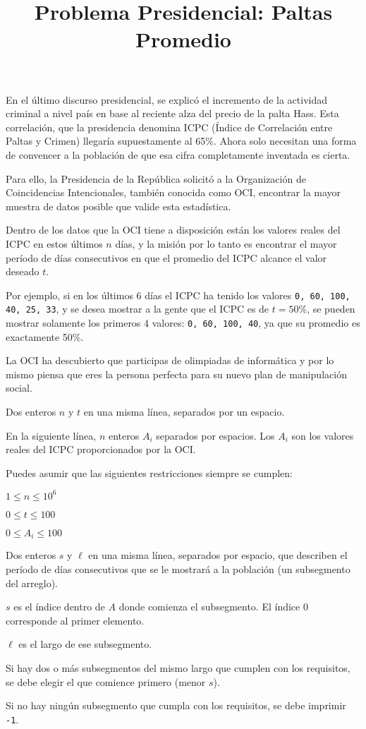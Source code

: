 \documentclass{oci}
\title{Problema Presidencial: Paltas Promedio}
\begin{document}
\begin{problemDescription}
En el último discurso presidencial, se explicó el incremento de la actividad criminal a nivel país en base al reciente alza del precio de la palta Hass. Esta correlación, que la presidencia denomina ICPC (Índice de Correlación entre Paltas y Crimen) llegaría supuestamente al 65\%. Ahora solo necesitan una forma de convencer a la población de que esa cifra completamente inventada es cierta.

Para ello, la Presidencia de la República solicitó a la Organización de Coincidencias Intencionales, también conocida como OCI, encontrar la mayor muestra de datos posible que valide esta estadística.

Dentro de los datos que la OCI tiene a disposición están los valores reales del ICPC en estos últimos $n$ días, y la misión por lo tanto es encontrar el mayor período de días consecutivos en que el promedio del ICPC alcance el valor deseado $t$.

Por ejemplo, si en los últimos 6 días el ICPC ha tenido los valores \texttt{0, 60, 100, 40, 25, 33}, y se desea mostrar a la gente que el ICPC es de $t=50\%$, se pueden mostrar solamente los primeros 4 valores: \texttt{0, 60, 100, 40}, ya que su promedio es exactamente 50\%.

La OCI ha descubierto que participas de olimpiadas de informática y por lo mismo piensa que eres la persona perfecta para su nuevo plan de manipulación social.
\end{problemDescription}

\begin{inputDescription}
Dos enteros $n$ y $t$ en una misma línea, separados por un espacio.

En la siguiente línea, $n$ enteros $A_i$ separados por espacios.
Los $A_i$ son los valores reales del ICPC proporcionados por la OCI.

Puedes asumir que las siguientes restricciones siempre se cumplen:

$1 \le n \le 10^6$

$0 \le t \le 100$

$0 \le A_i \le 100$
\end{inputDescription}

\begin{outputDescription}
Dos enteros $s$ y $\ell$ en una misma línea, separados por espacio, que describen el período de días consecutivos que se le mostrará a la población (un subsegmento del arreglo).

$s$ es el índice dentro de $A$ donde comienza el subsegmento. El índice $0$ corresponde al primer elemento.

$\ell$ es el largo de ese subsegmento.

Si hay dos o más subsegmentos del mismo largo que cumplen con los requisitos, se debe elegir el que comience primero (menor $s$).

Si no hay ningún subsegmento que cumpla con los requisitos, se debe imprimir \texttt{-1}.
\end{outputDescription}
\end{document}
